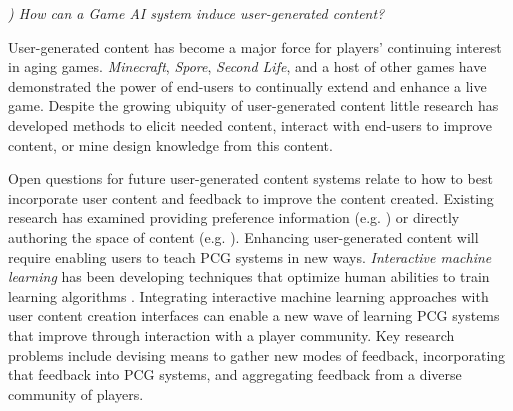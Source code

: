 \documentclass[conference]{IEEEtran}
\newcounter{questionno}
\newcommand{\subsubsectionx}[1]{{\em {\arabic{questionno}) #1}}
	\addtocounter{questionno}{1}
	}
\begin{document}


\subsubsectionx{How can a Game AI system induce user-generated content?}
%
User-generated content has become a major force for players' continuing interest in aging games.
{\em Minecraft}, {\em Spore}, {\em Second Life}, and a host of other games have demonstrated the power of end-users to continually extend and enhance a live game.
Despite the growing ubiquity of user-generated content little research has developed methods to elicit needed content, interact with end-users to improve content, or mine design knowledge from this content.

Open questions for future user-generated content systems relate to how to best incorporate user content and feedback to improve the content created. 
Existing research has examined providing preference information (e.g. \cite{hastings2009:gar, risi2012:petalz}) or directly authoring the space of content (e.g. \cite{smith2011:tanagra, smith2010:variations, dormans2009:machinations}). %
Enhancing user-generated content will require enabling users to teach PCG systems in new ways.
{\em Interactive machine learning} has been developing techniques that optimize human abilities to train learning algorithms \cite{amershi2011:interactive-ml-interaction}. 
Integrating interactive machine learning approaches with user content creation interfaces can enable a new wave of learning PCG systems that improve through interaction with a player community. 
Key research problems include devising means to gather new modes of feedback, incorporating that feedback into PCG systems, and aggregating feedback from a diverse community of players.
\end{document}
